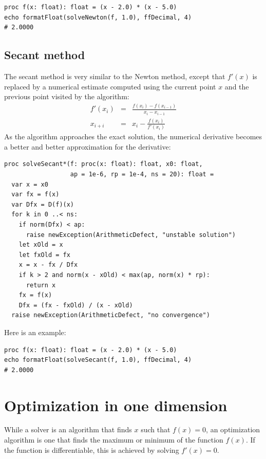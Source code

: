 \documentclass[justified, sixbynine]{tufte-book}
\def\ft{\small\tt}
\theoremstyle{plain}%
\newtheorem * {corollary}{Corollary}
\theoremstyle{definition}
\theoremstyle{remark}
\newtheorem * {remark}{Remark}
\newtheorem * {note}{Note}
\begin{document}
\begin{fullwidth}
\begin{lstlisting}
proc f(x: float): float = (x - 2.0) * (x - 5.0)
echo formatFloat(solveNewton(f, 1.0), ffDecimal, 4)
# 2.0000
\end{lstlisting}

\goodbreak\subsection{Secant method}


The secant method is very similar to the Newton method, except that $f'(x)$ is replaced by a numerical estimate computed using the current point $x$ and the previous point visited by the algorithm:
\begin{eqnarray}
f'(x_i) &=& \frac{f(x_i)-f(x_{i-1})}{x_i-x_{i-1}} \\
x_{i+i} &=& x_i - \frac{f(x_i)}{f'(x_i)}
\end{eqnarray}
As the algorithm approaches the exact solution, the numerical derivative becomes a better and better approximation for the derivative:

\begin{lstlisting}[caption={in file: {\ft nlib.nim}}]
proc solveSecant*(f: proc(x: float): float, x0: float,
                  ap = 1e-6, rp = 1e-4, ns = 20): float =
  var x = x0
  var fx = f(x)
  var Dfx = D(f)(x)
  for k in 0 ..< ns:
    if norm(Dfx) < ap:
      raise newException(ArithmeticDefect, "unstable solution")
    let xOld = x
    let fxOld = fx
    x = x - fx / Dfx
    if k > 2 and norm(x - xOld) < max(ap, norm(x) * rp):
      return x
    fx = f(x)
    Dfx = (fx - fxOld) / (x - xOld)
  raise newException(ArithmeticDefect, "no convergence")
\end{lstlisting}

Here is an example:

\begin{lstlisting}
proc f(x: float): float = (x - 2.0) * (x - 5.0)
echo formatFloat(solveSecant(f, 1.0), ffDecimal, 4)
# 2.0000
\end{lstlisting}

\goodbreak\section{Optimization in one dimension}


While a solver is an algorithm that finds $x$ such that $f(x)=0$, an optimization algorithm is one that finds the maximum or minimum of the function $f(x)$. If the function is differentiable, this is achieved by solving $f'(x)=0$.


\end{fullwidth}
\end{document}
